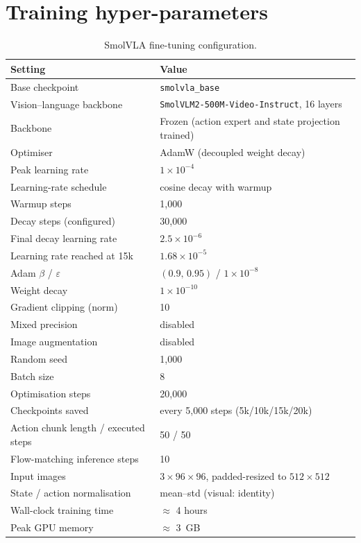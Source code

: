 \section{Training hyper-parameters}
\begin{table}[ht]
\caption{SmolVLA fine-tuning configuration.}
\begin{center}
\begin{tabular}{ll}
\toprule
Setting & Value \\
\midrule
Base checkpoint & \texttt{smolvla\_base} \\
Vision--language backbone & \texttt{SmolVLM2-500M-Video-Instruct}, 16 layers \\
Backbone & Frozen (action expert and state projection trained) \\
Optimiser & AdamW (decoupled weight decay) \\
Peak learning rate & $1\times10^{-4}$ \\
Learning-rate schedule & cosine decay with warmup \\
Warmup steps & 1{,}000 \\
Decay steps (configured) & 30{,}000 \\
Final decay learning rate & $2.5\times10^{-6}$ \\
Learning rate reached at 15k & $1.68\times10^{-5}$ \\
Adam $\beta$ / $\varepsilon$ & $(0.9,\,0.95)$ / $1\times10^{-8}$ \\
Weight decay & $1\times10^{-10}$ \\
Gradient clipping (norm) & 10 \\
Mixed precision & disabled \\
Image augmentation & disabled \\
Random seed & 1{,}000 \\
Batch size & 8 \\
Optimisation steps & 20{,}000 \\
Checkpoints saved & every 5{,}000 steps (5k/10k/15k/20k) \\
Action chunk length / executed steps & 50 / 50 \\
Flow-matching inference steps & 10 \\
Input images & $3\times96\times96$, padded-resized to $512\times512$ \\
State / action normalisation & mean--std (visual: identity) \\
Wall-clock training time & $\approx$ 4 hours \\
Peak GPU memory & $\approx$ 3~GB \\
\bottomrule
\end{tabular}
\end{center}
\label{tab:hyperparams}
\end{table}

